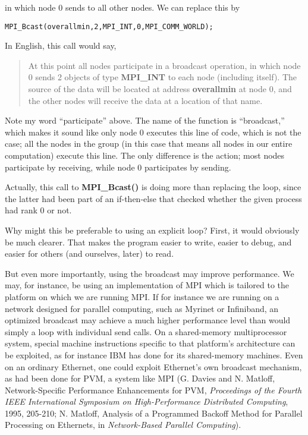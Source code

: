 in which node 0 sends to all other nodes.  We can replace this by

\begin{Verbatim}[fontsize=\relsize{-2}]
MPI_Bcast(overallmin,2,MPI_INT,0,MPI_COMM_WORLD);
\end{Verbatim}

In English, this call would say, 

\begin{quote}

At this point all nodes participate in a broadcast operation, in which
node 0 sends 2 objects of type {\bf MPI\_INT} to each node (including
itself).  The source of the data will be located at address {\bf
overallmin} at node 0, and the other nodes will receive the data at a
location of that name.

\end{quote}

Note my word ``participate'' above.  The name of the function is
``broadcast,'' which makes it sound like only node 0 executes this line
of code, which is not the case; all the nodes in the group (in this
case that means all nodes in our entire computation) execute this line.
The only difference is the action; most nodes participate by receiving,
while node 0 participates by sending.

Actually, this call to {\bf MPI\_Bcast()} is doing more than replacing
the loop, since the latter had been part of an if-then-else that checked
whether the given process had rank 0 or not.

Why might this be preferable to using an explicit loop?  First, it would
obviously be much clearer.  That makes the program easier to write,
easier to debug, and easier for others (and ourselves, later) to read.

But even more importantly, using the broadcast may improve performance.
We may, for instance, be using an implementation of MPI which is
tailored to the platform on which we are running MPI.  If for instance
we are running on a network designed for parallel computing, such as
Myrinet or Infiniband, an optimized broadcast may achieve a much higher
performance level than would simply a loop with individual send calls.
On a shared-memory multiprocessor system, special machine instructions
specific to that platform's architecture can be exploited, as for
instance IBM has done for its shared-memory machines.  Even on an
ordinary Ethernet, one could exploit Ethernet's own broadcast mechanism,
as had been done for PVM, a system like MPI (G. Davies and N. Matloff,
Network-Specific Performance Enhancements for PVM, {\it Proceedings  of
the  Fourth IEEE International Symposium on High-Performance Distributed
Computing}, 1995, 205-210; N. Matloff, Analysis of a Programmed Backoff
Method for Parallel Processing on Ethernets, in {\it Network-Based
Parallel Computing}).

